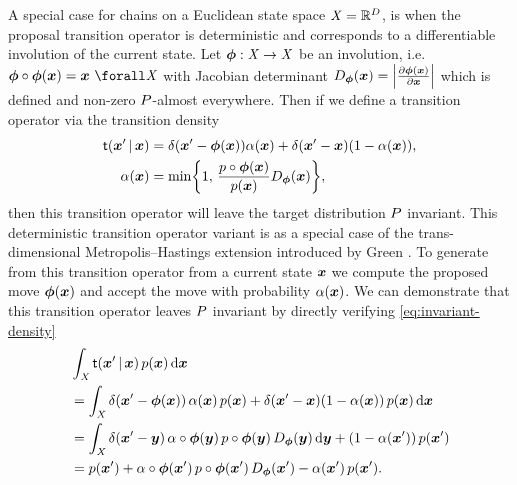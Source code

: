 A special case for chains on a Euclidean state space $\mathit{X} = \mathbb{R}^D$, is when the proposal transition operator is deterministic and corresponds to a differentiable involution of the current state. Let $\boldsymbol{\phi} : \mathit{X} \to \mathit{X}$ be an involution, i.e. $\vct{\phi} \circ \vct{\phi}(\vct{x}) = \vct{x} ~\forall \set{X}$ with Jacobian determinant $\jacobproddet{\vct{\phi}}{\vct{x}} = \left|\pd{\vct{\phi}(\vct{x})}{\vct{x}}\right|$ which is defined and non-zero $P$-almost everywhere. Then if we define a transition operator via the transition density
\begin{equation}\label{eq:metropolis-hastings-transition-deterministic-proposal}
\begin{split}
  \trans(\vct{x}' \gvn \vct{x}) &=
  \delta\lpa\vct{x}' - \vct{\phi}(\vct{x})\rpa \alpha(\vct{x}) +
  \delta(\vct{x}' - \vct{x}) \lpa 1 - \alpha(\vct{x}) \rpa,
  \\
  \alpha(\vct{x}) &=
  \min\lbr 
    1,\,\frac{\tgtdens \circ \vct{\phi}(\vct{x})}{\tgtdens(\vct{x})} \jacobproddet{\vct{\phi}}{\vct{x}}
  \rbr,
\end{split}
\end{equation}
then this transition operator will leave the target distribution $P$ invariant. This deterministic transition operator variant is as a special case of the trans-dimensional Metropolis--Hastings extension introduced by Green \citep{green1995reversible,geyer2003metropolis}. To generate from this transition operator from a current state $\boldsymbol{x}$ we compute the proposed move $\boldsymbol{\phi}(\boldsymbol{x})$ and accept the move with probability $\alpha(\boldsymbol{x})$. We can demonstrate that this transition operator leaves $P$ invariant by directly verifying \eqref{eq:invariant-density}
\begin{align}
  \label{eq:mh-det-proposal-derivation-1}
  &\int_{\set{X}} \trans(\vct{x}' \gvn \vct{x}) \, \tgtdens(\vct{x}) \,\dr\vct{x}
  \\
  \label{eq:mh-det-proposal-derivation-2}
  &=
  \int_{\set{X}} 
    \delta\lpa\vct{x}' - \vct{\phi}(\vct{x})\rpa \,\alpha(\vct{x}) \, \tgtdens(\vct{x}) +
    \delta(\vct{x}' - \vct{x}) \lpa 1 - \alpha(\vct{x}) \rpa \, \tgtdens(\vct{x})
  \,\dr\vct{x}
  \\
  \label{eq:mh-det-proposal-derivation-3}
  &=
  \int_{\set{X}} 
    \delta\lpa\vct{x}' - \vct{y}\rpa \,\alpha\circ\vct{\phi}(\vct{y}) \, 
    \tgtdens\circ\vct{\phi}(\vct{y}) \, \jacobproddet{\vct{\phi}}{\vct{y}} \,\dr\vct{y} +
  \lpa 1 - \alpha(\vct{x}') \rpa \, \tgtdens(\vct{x}')
  \\
  \label{eq:mh-det-proposal-derivation-4}
  &=
  p(\vct{x}') +
  \alpha\circ\vct{\phi}(\vct{x}') \, \tgtdens\circ\vct{\phi}(\vct{x}') \, 
  \jacobproddet{\vct{\phi}}{\vct{x}'} -
  \alpha(\vct{x}') \, \tgtdens(\vct{x}').
\end{align}

